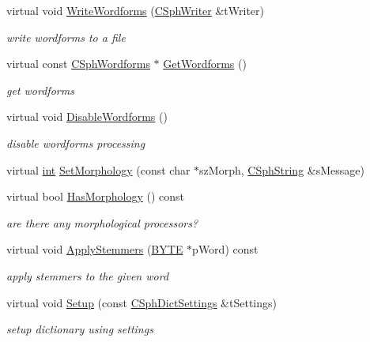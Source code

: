\begin{DoxyCompactItemize}
virtual void \hyperlink{structCSphTemplateDictTraits_a311a4fd5033e1226e8b6258351d5f933}{Write\-Wordforms} (\hyperlink{classCSphWriter}{C\-Sph\-Writer} \&t\-Writer)
\begin{DoxyCompactList}\small\item\em write wordforms to a file \end{DoxyCompactList}\item 
virtual const \hyperlink{structCSphWordforms}{C\-Sph\-Wordforms} $\ast$ \hyperlink{structCSphTemplateDictTraits_a602209418bfb225c101108206bff87f2}{Get\-Wordforms} ()
\begin{DoxyCompactList}\small\item\em get wordforms \end{DoxyCompactList}\item 
virtual void \hyperlink{structCSphTemplateDictTraits_afd00bf3597f5a1b962d5ef8de5d864c1}{Disable\-Wordforms} ()
\begin{DoxyCompactList}\small\item\em disable wordforms processing \end{DoxyCompactList}\item 
virtual \hyperlink{sphinxexpr_8cpp_a4a26e8f9cb8b736e0c4cbf4d16de985e}{int} \hyperlink{structCSphTemplateDictTraits_a0dcce56fd69e3eb81e144bf5d6ea0918}{Set\-Morphology} (const char $\ast$sz\-Morph, \hyperlink{structCSphString}{C\-Sph\-String} \&s\-Message)
\item 
virtual bool \hyperlink{structCSphTemplateDictTraits_a25b86d911c1a3f989563ec531e586a68}{Has\-Morphology} () const 
\begin{DoxyCompactList}\small\item\em are there any morphological processors? \end{DoxyCompactList}\item 
virtual void \hyperlink{structCSphTemplateDictTraits_ac2f6cfc920f4155c2dda23001abdf5a6}{Apply\-Stemmers} (\hyperlink{sphinxstd_8h_a4ae1dab0fb4b072a66584546209e7d58}{B\-Y\-T\-E} $\ast$p\-Word) const 
\begin{DoxyCompactList}\small\item\em apply stemmers to the given word \end{DoxyCompactList}\item 
virtual void \hyperlink{structCSphTemplateDictTraits_a46e6e5ee66d434ae1dca6401bea80fed}{Setup} (const \hyperlink{structCSphDictSettings}{C\-Sph\-Dict\-Settings} \&t\-Settings)
\begin{DoxyCompactList}\small\item\em setup dictionary using settings \end{DoxyCompactList}\item 

\end{DoxyCompactItemize}
